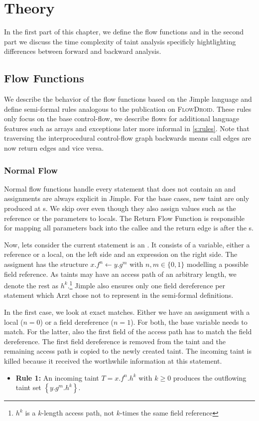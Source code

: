 \documentclass[../draft.tex]{subfiles}
\begin{document}
    \chapter{Theory}
    In the first part of this chapter, we define the flow functions and in the second part we discuss the time complexity of taint analysis specificly hightlighting differences between forward and backward analysis.

    \section{Flow Functions}\label{s:flowfunctions}
    We describe the behavior of the flow functions based on the Jimple language and define semi-formal rules analogous to the publication\cite{Arzt2017PhD} on \textsc{FlowDroid}. These rules only focus on the base control-flow, we describe flows for additional language features such as arrays and exceptions later more informal in \autoref{s:rules}. Note that traversing the interprocedural control-flow graph backwards means call edges are now return edges and vice versa. 

    \subsection{Normal Flow}\label{s:normalflow}
    Normal flow functions handle every statement that does not contain an  and assignments are always explicit in Jimple.
    For the base cases, new taint are only produced at s. We skip over  even though they also assign values such as the  reference or the parameters to locals. The Return Flow Function is responsible for mapping all parameters back into the callee and the return edge is after the s.

    Now, lets consider the current statement is an . It consists of a variable, either a reference or a local, on the left side and an expression on the right side. The assigment has the structure $x.f^n \leftarrow y.g^m$ with $n,m \in \{0,1\}$ modelling a possible field reference. As taints may have an access path of an arbitrary length, we denote the rest as $h^k$.\footnote{$h^k$ is a $k$-length access path, not $k$-times the same field reference} Jimple also ensures only one field dereference per statement which Arzt chose not to represent in the semi-formal definitions. 

    In the first case, we look at exact matches. Either we have an assignment with a local ($n=0$) or a field dereference ($n=1$). For both, the base variable needs to match. For the latter, also the first field of the access path has to match the field dereference.
    The first field dereference is removed from the taint and the remaining access path is copied to the newly created taint. The incoming taint is killed because it received the worthwhile information at this statement.
    \begin{itemize}
        \item[] \textbf{Rule 1:} An incoming taint $T = x.f^n.h^k$ with $k \geq 0$ produces the outflowing taint set $\left\{y.g^m.h^k\right\}$.
    \end{itemize} 
\end{document}
